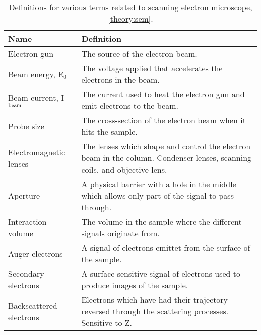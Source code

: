 \begin{table}[phb]
    \begin{center}
        \caption{
            Definitions for various terms related to scanning electron microscope, \cref{theory:sem}.
        }
        \renewcommand*{\arraystretch}{1.4}
        \label{tab:sem}
        \begin{tabular}{p{4cm}p{10.6cm}}
            \hline
            \textbf{Name}                       & \textbf{Definition}                                                                                                       \\
            \hline
            Electron gun                        & The source of the electron beam.                                                                                          \\
            Beam energy, E$_0$                  & The voltage applied that accelerates the electrons in the beam.                                                           \\
            Beam current, I$_\textnormal{beam}$ & The current used to heat the electron gun and emit electrons to the beam.                                                 \\
            Probe size                          & The cross-section of the electron beam when it hits the sample.                                                           \\
            Electromagnetic lenses              & The lenses which shape and control the electron beam in the column. Condenser lenses, scanning coils, and objective lens. \\
            Aperture                            & A physical barrier with a hole in the middle which allows only part of the signal to pass through.                        \\
            Interaction volume                  & The volume in the sample where the different signals originate from.                                                      \\
            Auger electrons                     & A signal of electrons emittet from the surface of the sample.                                                             \\
            Secondary electrons                 & A surface sensitive signal of electrons used to produce images of the sample.                                             \\
            Backscattered electrons             & Electrons which have had their trajectory reversed through the scattering processes. Sensitive to Z.                      \\
            \hline
        \end{tabular}
    \end{center}
\end{table}